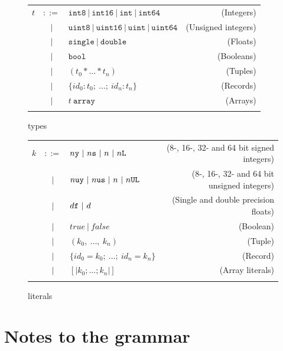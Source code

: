 \begin{figure}[h]
  \centering
  \begin{tabular}{@{}lclr}
    $t$ & $::=$ & $\texttt{int8}~|~\texttt{int16} ~|~ \texttt{int} ~ |~\texttt{int64} $ & (Integers) \\
        & $|$   & $\texttt{uint8} ~ | ~\texttt{uint16} ~|~\texttt{uint} ~|~\texttt{uint64} $ & (Unsigned integers) \\
        & $|$   & $\texttt{single} ~| ~\texttt{double}$ & (Floats) \\
        & $|$   & $\texttt{bool}$ & (Booleans) \\
        & $|$   & $(t_0 * \ldots * t_n)$ & (Tuples) \\
        & $|$   & $\{id_0:t_0;~\ldots;~id_n:t_n\}$ & (Records) \\
        & $|$   & $t~\mathtt{array}$& (Arrays) \\
    \\
  \end{tabular}
  \caption{\fshark{} types}
\label{fig:fsharktypes}
\end{figure}

\begin{figure}[h]
  \centering
  \begin{tabular}{@{}lclr}
    $k$ & $::=$ & $n\lit{y}~|~n\lit{s}~|~n~|~n\lit{L}$ & (8-, 16-, 32- and 64 bit signed integers) \\
        & $|$   & $n\lit{uy}~|~n\lit{us}~|~n~|~n\lit{UL}$ & (8-, 16-, 32- and 64 bit unsigned integers) \\
        & $|$   & $d\text{\ttfamily f}~|~d $ & (Single and double precision floats) \\
        & $|$   & $true~|~false$ & (Boolean) \\
        & $|$   & $(k_0 ,~\ldots ,~k_n)$ & (Tuple) \\
        & $|$   & $\{id_0=k_0;~\ldots;~id_n=k_n\}$ & (Record) \\
        & $|$   & $[\vert k_0 ; \ldots ; k_n\vert]$ & (Array literals) \\
    \\
  \end{tabular}
  \caption{\fshark{} literals}
\label{fig:fsharkliterals}
\end{figure}
\clearpage
\section{Notes to the \fshark{} grammar}
